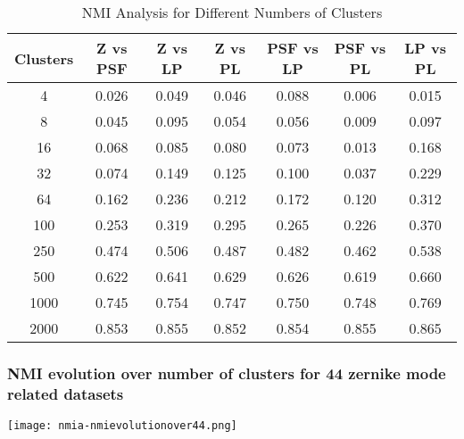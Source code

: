 \begin{table}[h!]
\centering
\begin{tabular}{|c|c|c|c|c|c|c|}
\hline
\textbf{Clusters} & \textbf{Z vs PSF} & \textbf{Z vs LP} & \textbf{Z vs PL} & \textbf{PSF vs LP} & \textbf{PSF vs PL} & \textbf{LP vs PL} \\
\hline
4   & 0.026 & 0.049 & 0.046 & 0.088 & 0.006 & 0.015 \\
8   & 0.045 & 0.095 & 0.054 & 0.056 & 0.009 & 0.097 \\
16  & 0.068 & 0.085 & 0.080 & 0.073 & 0.013 & 0.168 \\
32  & 0.074 & 0.149 & 0.125 & 0.100 & 0.037 & 0.229 \\
64  & 0.162 & 0.236 & 0.212 & 0.172 & 0.120 & 0.312 \\
100 & 0.253 & 0.319 & 0.295 & 0.265 & 0.226 & 0.370 \\
250 & 0.474 & 0.506 & 0.487 & 0.482 & 0.462 & 0.538 \\
500 & 0.622 & 0.641 & 0.629 & 0.626 & 0.619 & 0.660 \\
1000 & 0.745 & 0.754 & 0.747 & 0.750 & 0.748 & 0.769 \\
2000 & 0.853 & 0.855 & 0.852 & 0.854 & 0.855 & 0.865 \\
\hline
\end{tabular}
\caption{NMI Analysis for Different Numbers of Clusters}
\end{table}
		\FloatBarrier
		
		
	\subsubsection{NMI evolution over number of clusters for 44 zernike mode related datasets}
		\begin{figure*}[ht!]
			\centering
			\texttt{[image: nmia-nmievolutionover44.png]}
		\end{figure*}
		
